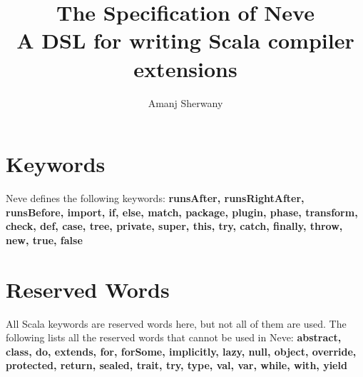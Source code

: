 \documentclass[12pt]{article}
\newcommand{\dsl}{Neve\xspace}
\begin{document}
\title{The Specification of \dsl\\
  \large{A DSL for writing Scala compiler extensions}}
\author{Amanj Sherwany}
  
  
  
\maketitle
\section{Keywords}

\raggedright
\dsl defines the following keywords: \textbf{runsAfter, runsRightAfter, runsBefore,
  import, if, else, match, package, plugin, phase, transform, check, def, case,
  tree, private, super, this, try, catch, finally, throw, new, true, false}

\section{Reserved Words}

All Scala keywords are reserved words here, but not all of them are used. The
following lists all the reserved words that cannot be used in \dsl:
\textbf{abstract, class, do, extends, for, forSome, implicitly, lazy, null,
  object, override, protected, return, sealed, trait, try, type, val, var,
  while, with, yield}
  

\newpage
\end{document}

